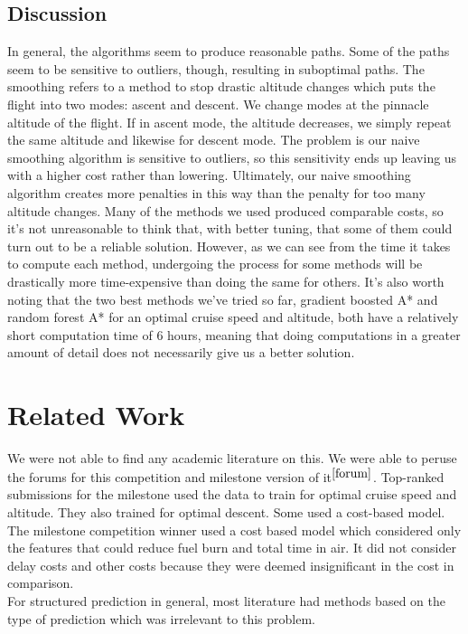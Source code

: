 \documentclass{article}[12pt]
\begin{document}
\begin{multicols}{2}
\subsection{Discussion}
In general, the algorithms seem to produce reasonable paths. Some of the paths seem to be sensitive to outliers, though, resulting in suboptimal paths. The smoothing refers to a method to stop drastic altitude changes which puts the flight into two modes: ascent and descent. We change modes at the pinnacle altitude of the flight. If in ascent mode, the altitude decreases, we simply repeat the same altitude and likewise for descent mode. The problem is our naive smoothing algorithm is sensitive to outliers, so this sensitivity ends up leaving us with a higher cost rather than lowering. Ultimately, our naive smoothing algorithm creates more penalties in this way than the penalty for too many altitude changes. Many of the methods we used produced comparable costs, so it's not unreasonable to think that, with better tuning, that some of them could turn out to be a reliable solution. However, as we can see from the time it takes to compute each method, undergoing the process for some methods will be drastically more time-expensive than doing the same for others. It's also worth noting that the two best methods we've tried so far, gradient boosted A* and random forest A* for an optimal cruise speed and altitude, both have a relatively short computation time of 6 hours, meaning that doing computations in a greater amount of detail does not necessarily give us a better solution.  

\section{Related Work}
We were not able to find any academic literature on this. We were able to peruse the forums for this competition and milestone version of it$^{\cite{forum}}$. Top-ranked submissions for the milestone used the data to train for optimal cruise speed and altitude. They also trained for optimal descent. Some used a cost-based model. The milestone competition winner used a cost based model which considered only the features that could reduce fuel burn and total time in air. It did not consider delay costs and other costs because they were deemed insignificant in the cost in comparison. \\
For structured prediction in general, most literature had methods based on the type of prediction which was irrelevant to this problem.


\end{multicols}
\end{document}
